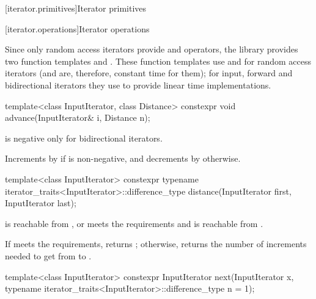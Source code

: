 \documentclass{wg21}
\begin{document}
[iterator.primitives]{Iterator primitives}

[iterator.operations]{Iterator operations}

\pnum
Since only random access iterators provide
\tcode{+}
and
\tcode{-}
operators, the library provides two
function templates
and
.
These
function templates
use
\tcode{+}
and
\tcode{-}
for random access iterators (and are, therefore, constant
time for them); for input, forward and bidirectional iterators they use
\tcode{++}
to provide linear time
implementations.

%
\begin{itemdecl}
	template<class InputIterator, class Distance>
	constexpr void advance(InputIterator& i, Distance n);
\end{itemdecl}

\begin{itemdescr}
	\pnum
	\expects
	is negative only for bidirectional iterators.
	
	\pnum
	\effects
	Increments  by  if  is non-negative, and
	decrements  by  otherwise.
\end{itemdescr}

%
\begin{itemdecl}
	template<class InputIterator>
	constexpr typename iterator_traits<InputIterator>::difference_type
	distance(InputIterator first, InputIterator last);
\end{itemdecl}

\begin{itemdescr}
	\pnum
	\expects
	 is reachable from , or
	 meets
	the  requirements and
	 is reachable from .
	
	\pnum
	\effects
	If  meets the  requirements,
	returns ; otherwise, returns
	the number of increments needed to get from
	to
	.
\end{itemdescr}

%
\begin{itemdecl}
	template<class InputIterator>
	constexpr InputIterator next(InputIterator x,
	typename iterator_traits<InputIterator>::difference_type n = 1);
\end{itemdecl}
\end{document}
